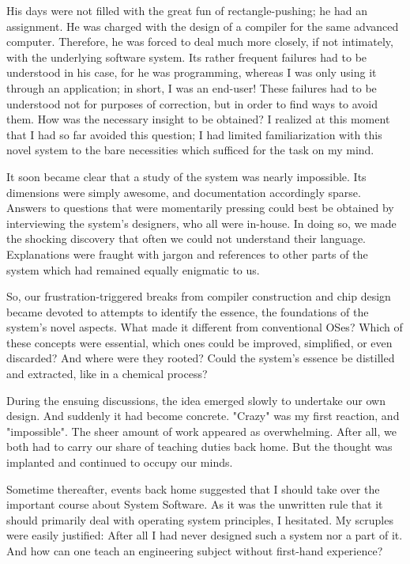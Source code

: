 His days were not filled with the great fun of rectangle-pushing; he had an assignment. He was
charged with the design of a compiler for the same advanced computer. Therefore, he was forced
to deal much more closely, if not intimately, with the underlying software system. Its rather frequent
failures had to be understood in his case, for he was programming, whereas I was only using it
through an application; in short, I was an end-user! These failures had to be understood not for
purposes of correction, but in order to find ways to avoid them. How was the necessary insight to
be obtained? I realized at this moment that I had so far avoided this question; I had limited
familiarization with this novel system to the bare necessities which sufficed for the task on my mind.

It soon became clear that a study of the system was nearly impossible. Its dimensions were simply
awesome, and documentation accordingly sparse. Answers to questions that were momentarily
pressing could best be obtained by interviewing the system's designers, who all were in-house. In
doing so, we made the shocking discovery that often we could not understand their language.
Explanations were fraught with jargon and references to other parts of the system which had
remained equally enigmatic to us.

So, our frustration-triggered breaks from compiler construction and chip design became devoted to
attempts to identify the essence, the foundations of the system's novel aspects. What made it
different from conventional OSes? Which of these concepts were essential, which
ones could be improved, simplified, or even discarded? And where were they rooted? Could the
system's essence be distilled and extracted, like in a chemical process?

During the ensuing discussions, the idea emerged slowly to undertake our own design. And
suddenly it had become concrete. "Crazy" was my first reaction, and "impossible". The sheer
amount of work appeared as overwhelming. After all, we both had to carry our share of teaching
duties back home. But the thought was implanted and continued to occupy our minds.

Sometime thereafter, events back home suggested that I should take over the important course
about System Software. As it was the unwritten rule that it should primarily deal with operating
system principles, I hesitated. My scruples were easily justified: After all I had never designed such
a system nor a part of it. And how can one teach an engineering subject without first-hand experience?

